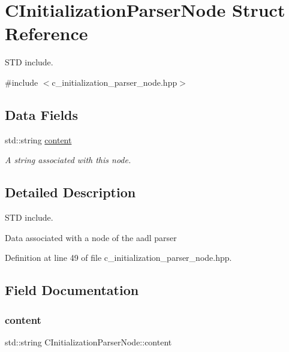 \hypertarget{structCInitializationParserNode}{}\section{C\+Initialization\+Parser\+Node Struct Reference}
\label{structCInitializationParserNode}


S\+TD include.  




{\ttfamily \#include $<$c\+\_\+initialization\+\_\+parser\+\_\+node.\+hpp$>$}

\subsection*{Data Fields}
\begin{DoxyCompactItemize}
\item 
std\+::string \hyperlink{structCInitializationParserNode_abfefed8443e06fdaff7c3e210cb5bd8e}{content}
\begin{DoxyCompactList}\small\item\em A string associated with this node. \end{DoxyCompactList}\end{DoxyCompactItemize}


\subsection{Detailed Description}
S\+TD include. 

Data associated with a node of the aadl parser 

Definition at line 49 of file c\+\_\+initialization\+\_\+parser\+\_\+node.\+hpp.



\subsection{Field Documentation}
\mbox{\label{structCInitializationParserNode_abfefed8443e06fdaff7c3e210cb5bd8e}} 
\subsubsection{\texorpdfstring{content}{content}}
{\footnotesize\ttfamily std\+::string C\+Initialization\+Parser\+Node\+::content}



